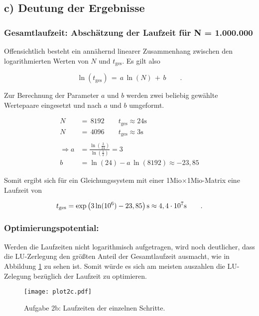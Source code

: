 \subsection*{c) Deutung der Ergebnisse}

\subsubsection*{Gesamtlaufzeit: Abschätzung der Laufzeit für N = 1.000.000}
Offensichtlich besteht ein annähernd linearer Zusammenhang zwischen den logarithmierten Werten von $N$ und $t_{\text{ges}}$. Es gilt also

\begin{equation*}
 \ln(t_{\text{ges}})\, = \, a\,\ln(N)\, +\, b \qquad .
\end{equation*}

\noindent Zur Berechnung der Parameter $a$ und $b$ werden zwei beliebig gewählte Wertepaare eingesetzt und nach $a$ und $b$ umgeformt.

\begin{align*}
  N\,&=\,8192 \qquad t_{\text{ges}} \approx 24 \text{s} \\
  N\,&=\,4096 \qquad t_{\text{ges}} \approx 3 \text{s}\\
  \\
  \Rightarrow a & = \frac{\ln\left(\frac{3}{24}\right)}{\ln\left(\frac{1}{2}\right)} = 3 \\
  b & = \ln(24)-a\, \ln(8192) \approx - 23,85
\end{align*}

Somit ergibt sich für ein Gleichungssystem mit einer 1Mio$\times$1Mio-Matrix eine Laufzeit von

\begin{equation*}
  t_{\text{ges}} = \exp\left(3\ln(10^6)-23,85\right) \text s \approx 4,4 \cdot 10^{7} \text{s} \qquad .
\end{equation*}

\subsubsection*{Optimierungspotential:}
Werden die Laufzeiten nicht logarithmisch aufgetragen, wird noch deutlicher, dass die LU-Zerlegung den größten Anteil der Gesamtlaufzeit ausmacht, wie in Abbildung \ref{fig:plot2c} zu sehen ist. Somit würde es sich am meisten auszahlen die LU-Zelegung bezüglich der Laufzeit zu optimieren.

\FloatBarrier
\begin{figure}[h]
    \centering
    \texttt{[image: plot2c.pdf]}
    \caption{Aufgabe 2b: Laufzeiten der einzelnen Schritte.}
    \label{fig:plot2c}
\end{figure}
\FloatBarrier

